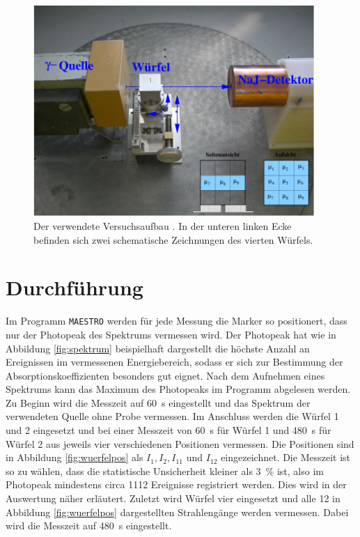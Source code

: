 \begin{figure}
  \centering
  \includegraphics[height=8.0cm]{content/aufbau.pdf} %
  \caption{Der verwendete Versuchsaufbau \cite[4]{anleitung}. In der unteren linken Ecke befinden
  sich zwei schematische Zeichnungen des vierten Würfels.}
  \label{fig:aufbau}
\end{figure}

\section{Durchführung}
\label{sec:Durchführung}

Im Programm \texttt{MAESTRO} werden für jede Messung die Marker so positionert,
dass nur der Photopeak des Spektrums vermessen wird.
Der Photopeak hat wie in Abbildung \ref{fig:spektrum} beispielhaft dargestellt
die höchste Anzahl an Ereignissen im vermessenen Energiebereich, sodass
er sich zur Bestimmung der Absorptionskoeffizienten besonders gut eignet.
Nach dem Aufnehmen eines Spektrums
kann das Maximum des Photopeaks im Programm abgelesen werden.
Zu Beginn wird die Messzeit auf \SI{60}{\second} eingestellt und das Spektrum
der verwendeten Quelle ohne Probe vermessen. Im Anschluss werden die
Würfel \num{1} und \num{2} eingesetzt und bei einer Messzeit von
\SI{60}{\second} für Würfel \num{1} und \SI{480}{\second} für Würfel \num{2}
aus jeweils vier verschiedenen Positionen vermessen. Die Positionen sind
in Abbildung \ref{fig:wuerfelpos} als
$I_{1}, I_{2}, I_{11}$ und $I_{12}$ eingezeichnet.
Die Messzeit ist so zu wählen, dass die statistische Unsicherheit kleiner
als \SI{3}{\percent} ist, also im Photopeak mindestens circa \num{1112}
Ereignisse registriert werden.
Dies wird in der Auswertung näher erläutert.
Zuletzt wird Würfel vier eingesetzt und alle \num{12} in Abbildung
\ref{fig:wuerfelpos} dargestellten Strahlengänge werden vermessen. Dabei wird die
Messzeit auf \SI{480}{\second} eingestellt.

